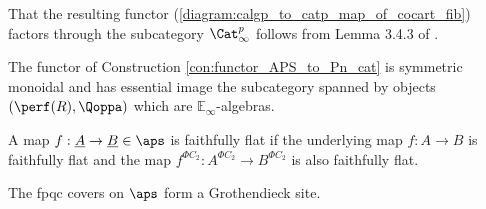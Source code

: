 \begin{construction}
    That the resulting functor (\ref{diagram:calgp_to_catp_map_of_cocart_fib}) factors through the subcategory $ \Cat^p_\infty $ follows from Lemma 3.4.3 of \cite{CDHHLMNNSI}. 
\end{construction}
\begin{lemma}
    The functor of Construction \ref{con:functor_APS_to_Pn_cat} is symmetric monoidal and has essential image the subcategory spanned by objects $(\perf(R),\Qoppa)$ which are $\mathbb{E}_\infty$-algebras.
\end{lemma}

\begin{definition}
     A map $f:\underline{A}\to \underline{B}\in \aps$ is faithfully flat if the underlying map $f:A\to B$ is faithfully flat and the map $f^{\Phi C_2}:A^{\Phi C_2}\to B^{\Phi C_2}$ is also faithfully flat.
\end{definition}

\begin{lemma}
    The fpqc covers on $\aps$ form a Grothendieck site. 
\end{lemma}

